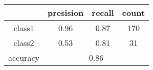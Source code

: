 
    \begin{tabular}{ | c | c | c | c | }
	\hline
	 & presision & recall & count \\ \hline
	class1 & 0.96 & 0.87 & 170 \\ \hline
	class2 & 0.53 & 0.81 & 31  \\ \hline
	\hline
	accuracy & \multicolumn{3}{c|}{0.86} \\
	\hline
    \end{tabular}